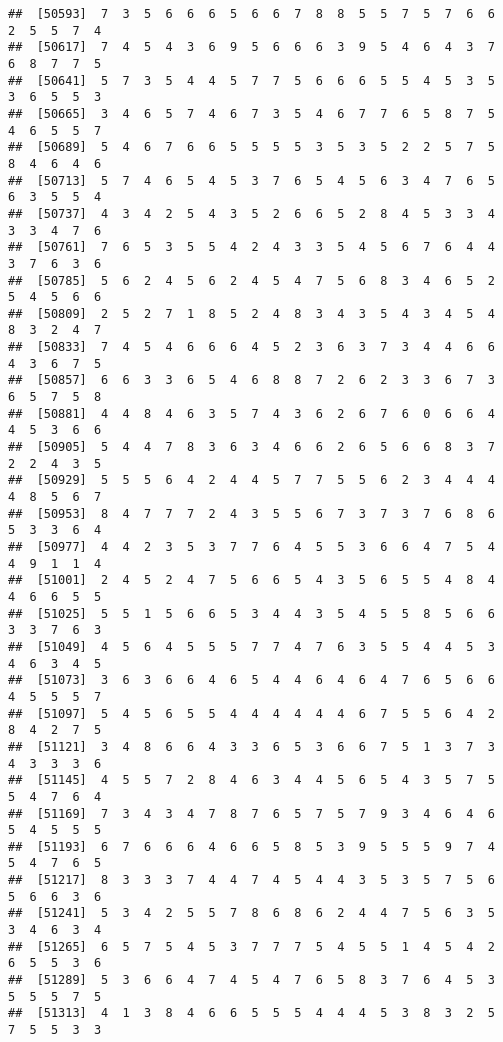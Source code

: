 \documentclass[
]{book}
\begin{document}
\begin{verbatim}
##  [50593]  7  3  5  6  6  6  5  6  6  7  8  8  5  5  7  5  7  6  6  2  5  5  7  4
##  [50617]  7  4  5  4  3  6  9  5  6  6  6  3  9  5  4  6  4  3  7  6  8  7  7  5
##  [50641]  5  7  3  5  4  4  5  7  7  5  6  6  6  5  5  4  5  3  5  3  6  5  5  3
##  [50665]  3  4  6  5  7  4  6  7  3  5  4  6  7  7  6  5  8  7  5  4  6  5  5  7
##  [50689]  5  4  6  7  6  6  5  5  5  5  3  5  3  5  2  2  5  7  5  8  4  6  4  6
##  [50713]  5  7  4  6  5  4  5  3  7  6  5  4  5  6  3  4  7  6  5  6  3  5  5  4
##  [50737]  4  3  4  2  5  4  3  5  2  6  6  5  2  8  4  5  3  3  4  3  3  4  7  6
##  [50761]  7  6  5  3  5  5  4  2  4  3  3  5  4  5  6  7  6  4  4  3  7  6  3  6
##  [50785]  5  6  2  4  5  6  2  4  5  4  7  5  6  8  3  4  6  5  2  5  4  5  6  6
##  [50809]  2  5  2  7  1  8  5  2  4  8  3  4  3  5  4  3  4  5  4  8  3  2  4  7
##  [50833]  7  4  5  4  6  6  6  4  5  2  3  6  3  7  3  4  4  6  6  4  3  6  7  5
##  [50857]  6  6  3  3  6  5  4  6  8  8  7  2  6  2  3  3  6  7  3  6  5  7  5  8
##  [50881]  4  4  8  4  6  3  5  7  4  3  6  2  6  7  6  0  6  6  4  4  5  3  6  6
##  [50905]  5  4  4  7  8  3  6  3  4  6  6  2  6  5  6  6  8  3  7  2  2  4  3  5
##  [50929]  5  5  5  6  4  2  4  4  5  7  7  5  5  6  2  3  4  4  4  4  8  5  6  7
##  [50953]  8  4  7  7  7  2  4  3  5  5  6  7  3  7  3  7  6  8  6  5  3  3  6  4
##  [50977]  4  4  2  3  5  3  7  7  6  4  5  5  3  6  6  4  7  5  4  4  9  1  1  4
##  [51001]  2  4  5  2  4  7  5  6  6  5  4  3  5  6  5  5  4  8  4  4  6  6  5  5
##  [51025]  5  5  1  5  6  6  5  3  4  4  3  5  4  5  5  8  5  6  6  3  3  7  6  3
##  [51049]  4  5  6  4  5  5  5  7  7  4  7  6  3  5  5  4  4  5  3  4  6  3  4  5
##  [51073]  3  6  3  6  6  4  6  5  4  4  6  4  6  4  7  6  5  6  6  4  5  5  5  7
##  [51097]  5  4  5  6  5  5  4  4  4  4  4  4  6  7  5  5  6  4  2  8  4  2  7  5
##  [51121]  3  4  8  6  6  4  3  3  6  5  3  6  6  7  5  1  3  7  3  4  3  3  3  6
##  [51145]  4  5  5  7  2  8  4  6  3  4  4  5  6  5  4  3  5  7  5  5  4  7  6  4
##  [51169]  7  3  4  3  4  7  8  7  6  5  7  5  7  9  3  4  6  4  6  5  4  5  5  5
##  [51193]  6  7  6  6  6  4  6  6  5  8  5  3  9  5  5  5  9  7  4  5  4  7  6  5
##  [51217]  8  3  3  3  7  4  4  7  4  5  4  4  3  5  3  5  7  5  6  5  6  6  3  6
##  [51241]  5  3  4  2  5  5  7  8  6  8  6  2  4  4  7  5  6  3  5  3  4  6  3  4
##  [51265]  6  5  7  5  4  5  3  7  7  7  5  4  5  5  1  4  5  4  2  6  5  5  3  6
##  [51289]  5  3  6  6  4  7  4  5  4  7  6  5  8  3  7  6  4  5  3  5  5  5  7  5
##  [51313]  4  1  3  8  4  6  6  5  5  5  4  4  4  5  3  8  3  2  5  7  5  5  3  3

\end{verbatim}
\end{document}

